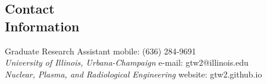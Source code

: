 \documentclass[margin,line]{resume}
\begin{document}
\begin{resume}

    \section{\mysidestyle Contact\\Information}
    Graduate Research Assistant \hfill mobile: (636) 284-9691 \vspace{0mm}\\\vspace{0mm}%
        \textsl{University of Illinois, Urbana-Champaign}
        \hfill e-mail: gtw2@illinois.edu           \vspace{0mm}\\\vspace{0mm}%
    \textsl{Nuclear, Plasma, and Radiological Engineering} \hfill website: gtw2.github.io%
        \vspace{0mm}\\\vspace{0mm} 


\end{resume}
\end{document}

